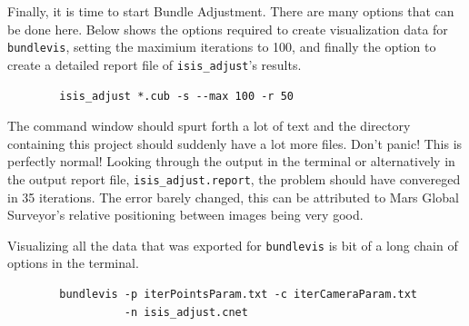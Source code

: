 \begin{center}
\end{center}

Finally, it is time to start Bundle Adjustment. There are many options
that can be done here. Below shows the options required to create
visualization data for \texttt{bundlevis}, setting the maximium
iterations to 100, and finally the option to create a detailed report
file of \texttt{isis\_adjust}'s results.

\begin{verbatim}
        isis_adjust *.cub -s --max 100 -r 50
\end{verbatim}

The command window should spurt forth a lot of text and the directory
containing this project should suddenly have a lot more files. Don't
panic! This is perfectly normal! Looking through the output in the
terminal or alternatively in the output report file,
\verb=isis_adjust.report=, the problem should have convereged in 35
iterations. The error barely changed, this can be attributed to Mars
Global Surveyor's relative positioning between images being very good. 

Visualizing all the data that was exported for \texttt{bundlevis} is bit of a
long chain of options in the terminal.

\begin{verbatim}
        bundlevis -p iterPointsParam.txt -c iterCameraParam.txt 
                  -n isis_adjust.cnet
\end{verbatim}

